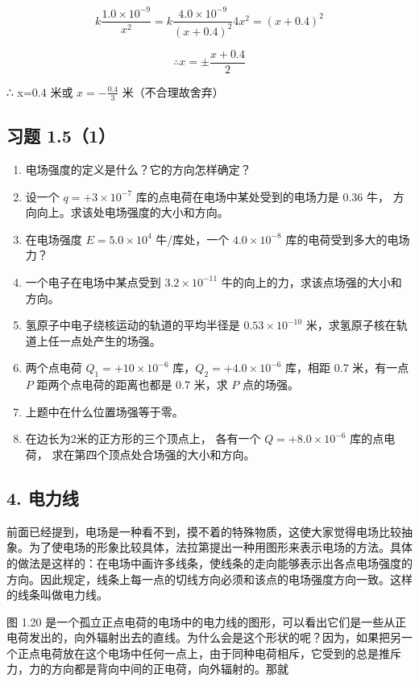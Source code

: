 \[
k \frac{1.0 \times 10^{- 9}}{x^{2}} = k \frac{4.0 \times 10^{- 9}}{(x + 0.4)^{2}} 4 x^{2} = (x + 0.4)^{2}
\]

\[
\therefore x = \pm \frac{x + 0.4}{2}
\]

∴ x=0.4 米或 \(x=-\frac{0.4}{3}\) 米（不合理故舍弃）

\subsection{习题 1.5（1）}\label{ux4e60ux9898-1.51}

\begin{enumerate}
\def\labelenumi{\arabic{enumi}.}
\item
  电场强度的定义是什么？它的方向怎样确定？
\item
  设一个 \(q = +3 \times 10^{-7}\) 库的点电荷在电场中某处受到的电场力是
  0.36 牛， 方向向上。求该处电场强度的大小和方向。
\item
  在电场强度 \(E = 5.0 \times 10^{4}\) 牛/库处，一个
  \(4.0 \times 10^{-8}\) 库的电荷受到多大的电场力？
\item
  一个电子在电场中某点受到 \(3.2 \times 10^{-11}\)
  牛的向上的力，求该点场强的大小和方向。
\item
  氢原子中电子绕核运动的轨道的平均半径是 \(0.53 \times 10^{-10}\)
  米，求氢原子核在轨道上任一点处产生的场强。
\item
  两个点电荷 \(Q_{1} = +10 \times 10^{-6}\)
  库，\(Q_{2} = +4.0 \times 10^{-6}\) 库，相距 0.7 米，有一点 \(P\)
  距两个点电荷的距离也都是 0.7 米，求 \(P\) 点的场强。
\item
  上题中在什么位置场强等于零。
\item
  在边长为2米的正方形的三个顶点上， 各有一个 \(Q = +8.0 \times 10^{-6}\)
  库的点电荷， 求在第四个顶点处合场强的大小和方向。
\end{enumerate}

\subsection{4. 电力线}\label{ux7535ux529bux7ebf}

前面已经提到，电场是一种看不到，摸不着的特殊物质，这使大家觉得电场比较抽象。为了使电场的形象比较具体，法拉第提出一种用图形来表示电场的方法。具体的做法是这样的：在电场中画许多线条，使线条的走向能够表示出各点电场强度的方向。因此规定，线条上每一点的切线方向必须和该点的电场强度方向一致。这样的线条叫做电力线。

图 1.20
是一个孤立正点电荷的电场中的电力线的图形，可以看出它们是一些从正电荷发出的，向外辐射出去的直线。为什么会是这个形状的呢？因为，如果把另一个正点电荷放在这个电场中任何一点上，由于同种电荷相斥，它受到的总是推斥力，力的方向都是背向中间的正电荷，向外辐射的。那就

